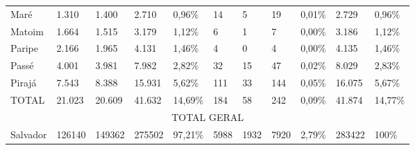\begin{table}[!htp]
{\begin{tiny}
\begin{tabular}{m{1.3cm} m{1cm} m{1cm} m{1.1cm}  m{1cm} m{0.7cm} m{0.7cm} m{1.1cm} m{1cm} m{1cm} m{1cm} }
Maré	&1.310	&1.400	&2.710	&0,96\%	&14	&5	&19	&0,01\%	&2.729	&0,96\% \\
Matoim	&1.664	&1.515	&3.179	&1,12\%	&6	&1	&7	&0,00\%	&3.186	&1,12\% \\
Paripe	&2.166	&1.965	&4.131	&1,46\%	&4	&0	&4	&0,00\%	&4.135	&1,46\% \\
Passé	&4.001	&3.981	&7.982	&2,82\%	&32	&15	&47	&0,02\%	&8.029	&2,83\% \\
Pirajá	&7.543	&8.388	&15.931	&5,62\%	&111	&33	&144	&0,05\%	&16.075	&5,67\% \\
TOTAL	&21.023	&20.609	&41.632	&14,69\%	&184	&58	&242	&0,09\%	&41.874	&14,77\% \\
\hline
\multicolumn{11}{c}{TOTAL GERAL} \\
\hline
Salvador	&126140	&149362	&275502	&97,21\%	&5988	&1932	&7920	&2,79\%	&283422	&100\% \\
\hline
\end{tabular} 
\end{tiny}
}
{ }
\end{table}